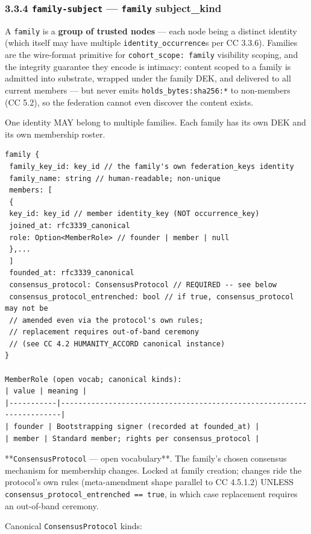 \documentclass[11pt]{article}
\begin{document}
\subsubsection*{3.3.4 \texttt{family-subject} — \texttt{family} subject\_kind}


A \texttt{family} is a \textbf{group of trusted nodes} — each node being a distinct identity (which itself may have multiple \texttt{identity\_occurrence}s per CC 3.3.6). Families are the wire-format primitive for \texttt{cohort\_scope: family} visibility scoping, and the integrity guarantee they encode is intimacy: content scoped to a family is admitted into substrate, wrapped under the family DEK, and delivered to all current members — but never emits \texttt{holds\_bytes:sha256:*} to non-members (CC 5.2), so the federation cannot even discover the content exists.


One identity MAY belong to multiple families. Each family has its own DEK and its own membership roster.


\begin{lstlisting}
family {
 family_key_id: key_id // the family's own federation_keys identity
 family_name: string // human-readable; non-unique
 members: [
 {
 key_id: key_id // member identity_key (NOT occurrence_key)
 joined_at: rfc3339_canonical
 role: Option<MemberRole> // founder | member | null
 },...
 ]
 founded_at: rfc3339_canonical
 consensus_protocol: ConsensusProtocol // REQUIRED -- see below
 consensus_protocol_entrenched: bool // if true, consensus_protocol may not be
 // amended even via the protocol's own rules;
 // replacement requires out-of-band ceremony
 // (see CC 4.2 HUMANITY_ACCORD canonical instance)
}

MemberRole (open vocab; canonical kinds):
| value | meaning |
|-----------|----------------------------------------------------------------------|
| founder | Bootstrapping signer (recorded at founded_at) |
| member | Standard member; rights per consensus_protocol |
\end{lstlisting}

**\texttt{ConsensusProtocol} — open vocabulary**. The family's chosen consensus mechanism for membership changes. Locked at family creation; changes ride the protocol's own rules (meta-amendment shape parallel to CC 4.5.1.2) UNLESS \texttt{consensus\_protocol\_entrenched == true}, in which case replacement requires an out-of-band ceremony.


Canonical \texttt{ConsensusProtocol} kinds:
\end{document}
